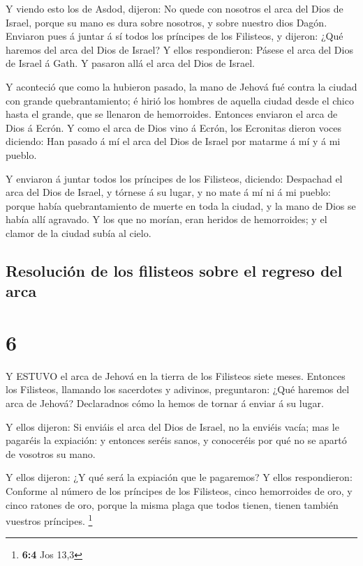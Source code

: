  Y viendo esto los de Asdod, dijeron: No quede con nosotros
el arca del Dios de Israel, porque su mano es dura sobre nosotros, y
sobre nuestro dios Dagón.  Enviaron pues á juntar á sí todos
los príncipes de los Filisteos, y dijeron: ¿Qué haremos del arca del
Dios de Israel? Y ellos respondieron: Pásese el arca del Dios de Israel
á Gath. Y pasaron allá el arca del Dios de Israel.

 Y aconteció que como la hubieron pasado, la mano de Jehová
fué contra la ciudad con grande quebrantamiento; é hirió los hombres de
aquella ciudad desde el chico hasta el grande, que se llenaron de
hemorroides.  Entonces enviaron el arca de Dios á Ecrón. Y
como el arca de Dios vino á Ecrón, los Ecronitas dieron voces diciendo:
Han pasado á mí el arca del Dios de Israel por matarme á mí y á mi
pueblo.

 Y enviaron á juntar todos los príncipes de los Filisteos,
diciendo: Despachad el arca del Dios de Israel, y tórnese á su lugar, y
no mate á mí ni á mi pueblo: porque había quebrantamiento de muerte en
toda la ciudad, y la mano de Dios se había allí agravado. 
Y los que no morían, eran heridos de hemorroides; y el clamor de la
ciudad subía al cielo.

\hypertarget{resoluciuxf3n-de-los-filisteos-sobre-el-regreso-del-arca}{%
\subsection{Resolución de los filisteos sobre el regreso del
arca}\label{resoluciuxf3n-de-los-filisteos-sobre-el-regreso-del-arca}}

\hypertarget{section-5}{%
\section{6}\label{section-5}}

 Y ESTUVO el arca de Jehová en la tierra de los Filisteos
siete meses.  Entonces los Filisteos, llamando los
sacerdotes y adivinos, preguntaron: ¿Qué haremos del arca de Jehová?
Declaradnos cómo la hemos de tornar á enviar á su lugar.

 Y ellos dijeron: Si enviáis el arca del Dios de Israel, no
la enviéis vacía; mas le pagaréis la expiación: y entonces seréis sanos,
y conoceréis por qué no se apartó de vosotros su mano.

 Y ellos dijeron: ¿Y qué será la expiación que le pagaremos?
Y ellos respondieron: Conforme al número de los príncipes de los
Filisteos, cinco hemorroides de oro, y cinco ratones de oro, porque la
misma plaga que todos tienen, tienen también vuestros príncipes.
\footnote{\textbf{6:4} Jos 13,3}

